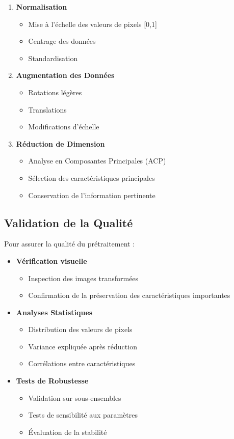 \begin{enumerate}
    \item \textbf{Normalisation}
    \begin{itemize}
        \item Mise à l'échelle des valeurs de pixels [0,1]
        \item Centrage des données
        \item Standardisation
    \end{itemize}

    \item \textbf{Augmentation des Données}
    \begin{itemize}
        \item Rotations légères
        \item Translations
        \item Modifications d'échelle
    \end{itemize}

    \item \textbf{Réduction de Dimension}
    \begin{itemize}
        \item Analyse en Composantes Principales (ACP)
        \item Sélection des caractéristiques principales
        \item Conservation de l'information pertinente
    \end{itemize}
\end{enumerate}

\subsection{Validation de la Qualité}
Pour assurer la qualité du prétraitement :

\begin{itemize}
    \item \textbf{Vérification visuelle}
    \begin{itemize}
        \item Inspection des images transformées
        \item Confirmation de la préservation des caractéristiques importantes
    \end{itemize}

    \item \textbf{Analyses Statistiques}
    \begin{itemize}
        \item Distribution des valeurs de pixels
        \item Variance expliquée après réduction
        \item Corrélations entre caractéristiques
    \end{itemize}

    \item \textbf{Tests de Robustesse}
    \begin{itemize}
        \item Validation sur sous-ensembles
        \item Tests de sensibilité aux paramètres
        \item Évaluation de la stabilité
    \end{itemize}
\end{itemize}